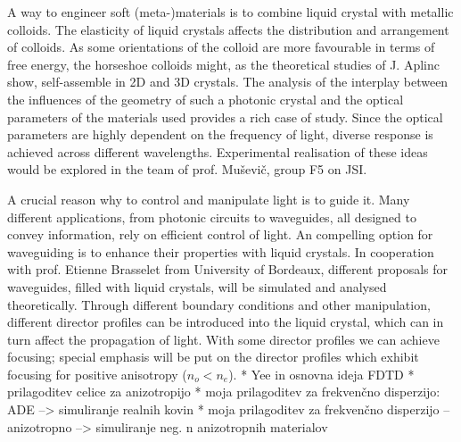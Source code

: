 \documentclass[a4paper,11pt]{article}
\begin{document}



A way to engineer soft (meta-)materials is to combine liquid crystal with metallic colloids. 
The elasticity of liquid crystals affects the distribution and arrangement of colloids. 
As some orientations of the colloid are more favourable in terms of free energy, the horseshoe colloids might, as the theoretical studies of J. Aplinc \cite{jure-HS} show, self-assemble in 2D and 3D crystals. 
The analysis of the interplay between the influences of the geometry of such a photonic crystal and the optical parameters of the materials used provides a rich case of study. 
Since the optical parameters are highly dependent on the frequency of light, diverse response is achieved across different wavelengths. 
Experimental realisation of these ideas would be explored in the team of prof. Muševič, group F5 on JSI. 

A crucial reason why to control and manipulate light is to guide it. 
Many different applications, from photonic circuits to waveguides, all designed to convey information, rely on efficient control of light. 
An compelling option for waveguiding is to enhance their properties with liquid crystals. 
In cooperation with prof. Etienne Brasselet from University of Bordeaux, different proposals for waveguides, filled with liquid crystals, will be simulated and analysed theoretically. 
Through different boundary conditions and other manipulation, different director profiles can be introduced into the liquid crystal, which can in turn affect the propagation of light. 
With some director profiles we can achieve focusing; special emphasis will be put on the director profiles which exhibit focusing for positive anisotropy ($n_{o} < n_e$).
% 
%
%
%
%
% 
% 
%
%
%
* Yee in osnovna ideja FDTD
* prilagoditev celice za anizotropijo
* moja prilagoditev za frekvenčno disperzijo: ADE --> simuliranje realnih kovin
* moja prilagoditev za frekvenčno disperzijo -- anizotropno --> simuliranje neg. n anizotropnih materialov
\end{document}
